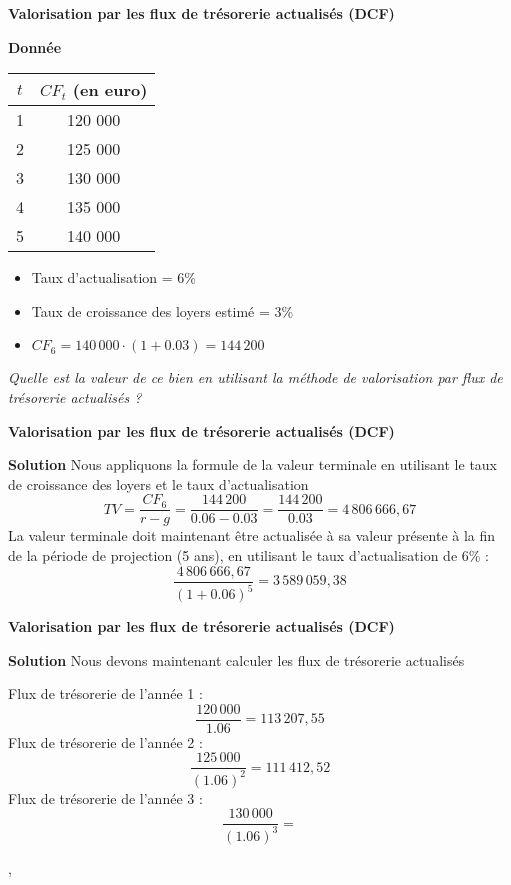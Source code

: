 \documentclass{beamer}
\begin{document}
\begin{frame}{\textbf{Valorisation par les flux de trésorerie actualisés (DCF)}}
	\begin{exampleblock}{\textbf{Donnée}}
		\begin{center}
			\begin{tabular}{@{}cc@{}}
				\toprule
				\( t \) & \( CF_t\) (en euro)\\ \midrule
				1   & 120 000                   \\
				2   & 125 000                   \\
				3   & 130 000                   \\
				4   & 135 000                   \\
				5   & 140 000                   \\ \bottomrule
			\end{tabular}
		\end{center}
		
\begin{itemize}
	\item Taux d'actualisation = 6\%
	\item Taux de croissance des loyers estimé = 3\%
	\item \( CF_6 = 140\,000 \cdot (1+0.03)=144\,200 \)
\end{itemize}
		
\textit{Quelle est la valeur de ce bien en utilisant la méthode de valorisation par flux de trésorerie actualisés ?}
\end{exampleblock}
\end{frame}

\begin{frame}{\textbf{Valorisation par les flux de trésorerie actualisés (DCF)}}

\begin{exampleblock}{\textbf{Solution}}
Nous appliquons la formule de la valeur terminale en utilisant le taux de croissance des loyers et le taux d'actualisation
\[ TV = \frac{CF_6}{r-g}=\frac{144\,200}{0.06-0.03}=\frac{144\,200}{0.03}=4\,806\,666,67\]
La valeur terminale doit maintenant être actualisée à sa valeur présente à la fin de la période de projection (5 ans), en utilisant le taux d'actualisation de 6\% :
\[ \frac{4\,806\,666,67}{(1+0.06)^5} = 3\,589\,059,38\]

\end{exampleblock}


\end{frame}


\begin{frame}{\textbf{Valorisation par les flux de trésorerie actualisés (DCF)}}
	
	\begin{exampleblock}{\textbf{Solution}}
Nous devons maintenant calculer les flux de trésorerie actualisés
		
Flux de trésorerie de l'année 1 : 
\[ \frac{120\,000}{1.06}=113\,207,55\]
Flux de trésorerie de l'année 2 : 
\[ \frac{125\,000}{(1.06)^2}=111\,412,52 \]
Flux de trésorerie de l'année 3 : 
\[ \frac{130\,000}{(1.06)^3}= \]
		
		
		
	\end{exampleblock}
	
	
,\end{frame}
\end{document}
